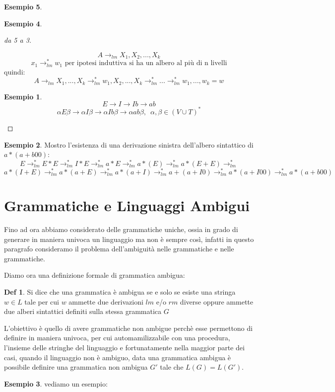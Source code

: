 \documentclass[a4paper]{book}
\theoremstyle{definition}%
\newtheorem*{defi}{Def}%
\newtheorem*{esempio}{Esempio}
\begin{document}
\begin{esempio}
\begin{esempio}
\begin{proof}[da 5 a 3]
\begin{itemize}
\begin{center}
\end{center}
$$A\to_{lm} X_1,X_2,...,X_k$$
$$x_1\to^*_{lm}w_1 \mbox{ per ipotesi induttiva si ha un albero al più di n livelli}$$
quindi:
$$A\to_{lm}X_1,...,X_k\to^*_{lm}w_1,X_2,...,X_k\to^*_{lm}...\to^*_{lm}w_1,...,w_k=w$$
\end{itemize}
\begin{esempio}
$$E\to I\to Ib\to ab$$
$$\alpha E\beta\to\alpha I\beta\to \alpha Ib\beta\to \alpha ab\beta,\,\,\,\alpha,\beta\in(V\cup T)^*$$
\end{esempio}
\end{proof}
\begin{esempio}
Mostro l'esistenza di una derivazione sinistra dell'albero sintattico di $a*(a+b00)$:
$$E\to^*_{lm}E*E\to^*_{lm}I*E\to^*_{lm}a*E\to^*_{lm}a*(E)\to^*_{lm}a*(E+E)\to^*_{lm}$$
$$a*(I+E)\to^*_{lm}a*(a+E)\to^*_{lm}a*(a+I)\to^*_{lm}a+(a+I0)\to^*_{lm}a*(a+I00)\to^*_{lm}a*(a+b00)$$
\end{esempio}

\section{Grammatiche e Linguaggi Ambigui}
Fino ad ora abbiamo considerato delle grammatiche uniche, ossia in grado di generare in maniera univoca un linguaggio ma non è sempre così,
infatti in questo paragrafo consideramo il problema dell'ambiguità nelle grammatiche e nelle grammatiche.

Diamo ora una definizione formale di grammatica ambigua:
  \begin{defi}
    Si dice che una grammatica è ambigua se e solo se esiste una stringa $w \in L$ tale per cui $w$ ammette due derivazioni $lm$ e/o $rm$
    diverse oppure ammette due alberi sintattici definiti sulla stessa grammatica $G$
  \end{defi}
  L'obiettivo è quello di avere grammatiche non ambigue perchè esse permettono di definire in maniera univoca, per cui automamilizzabile
  con una procedura, l'insieme delle stringhe del linguaggio e fortunatamente nella maggior parte dei casi, quando il linguaggio non è ambiguo,
  data una grammatica ambigua è possibile definire una grammatica non ambigua $G'$ tale che $L(G) = L(G')$.
\begin{esempio}
vediamo un esempio:


\end{esempio}
\end{esempio}
\end{esempio}
\end{document}
